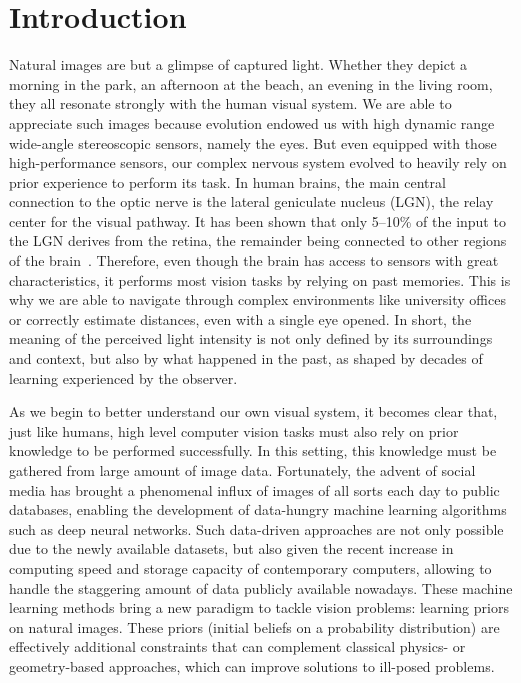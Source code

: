 \chapter*{Introduction}         %

Natural images are but a glimpse of captured light. Whether they depict a morning in the park, an afternoon at the beach, an evening in the living room, they all resonate strongly with the human visual system. We are able to appreciate such images because evolution endowed us with high dynamic range wide-angle stereoscopic sensors, namely the eyes. But even equipped with those high-performance sensors, our complex nervous system evolved to heavily rely on prior experience to perform its task. In human brains, the main central connection to the optic nerve is the lateral geniculate nucleus (LGN), the relay center for the visual pathway. It has been shown that only 5--10\% of the input to the LGN derives from the retina, the remainder being connected to other regions of the brain~\cite{van2000relative}. Therefore, even though the brain has access to sensors with great characteristics, it performs most vision tasks by relying on past memories. This is why we are able to navigate through complex environments like university offices or correctly estimate distances, even with a single eye opened.
In short, the meaning of the perceived light intensity is not only defined by its surroundings and context, but also by what happened in the past, as shaped by decades of learning experienced by the observer. 

As we begin to better understand our own visual system, it becomes clear that, just like humans, high level computer vision tasks must also rely on prior knowledge to be performed successfully. In this setting, this knowledge must be gathered from large amount of image data. Fortunately, the advent of social media has brought a phenomenal influx of images of all sorts each day to public databases, enabling the development of data-hungry machine learning algorithms such as deep neural networks. Such data-driven approaches are not only possible due to the newly available datasets, but also given the recent increase in computing speed and storage capacity of contemporary computers, allowing to handle the staggering amount of data publicly available nowadays. These machine learning methods bring a new paradigm to tackle vision problems: learning priors on natural images. These priors (initial beliefs on a probability distribution) are effectively additional constraints that can complement classical physics- or geometry-based approaches, which can improve solutions to ill-posed problems. 

